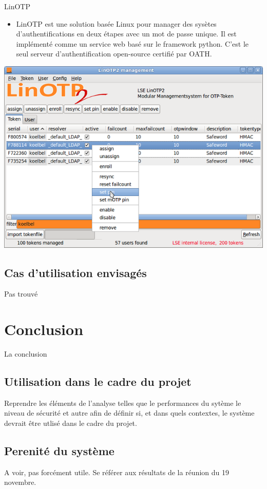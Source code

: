 \documentclass{../res/univ-projet}
\begin{document}
  LinOTP
  \begin{itemize}
    \item LinOTP est une solution basée Linux pour manager des sys\`{e}tes d'authentifications en deux \'{e}tapes avec un mot de passe unique.
    Il est impl\'{e}ment\'{e} comme un service web bas\'{e} sur le framework python. C'est le seul serveur d'authentification open-source certifi\'{e} par OATH.
  \end{itemize}
  \includegraphics[scale=0.5]{linOTP.png}
  
  \subsection{Cas d'utilisation envisagés}
  Pas trouvé
  
\section{Conclusion}
La conclusion
  \subsection{Utilisation dans le cadre du projet}
  Reprendre les éléments de l'analyse telles que le performances du sytème le niveau de sécurité et autre afin de définir si, et dans quels contextes, le système devrait
  \^etre utlisé dans le cadre du projet.
  
  \subsection{Perenité du système}
  A voir, pas forcément utile. Se référer aux résultats de la réunion du 19 novembre.
    
\end{document}
